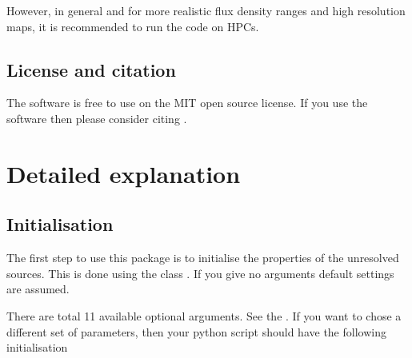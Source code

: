 \documentclass[letterpaper,10pt,english]{sphinxmanual}
\begin{document}
\sphinxAtStartPar
However, in general and for more realistic flux density ranges and high
resolution maps, it is recommended to run the code on HPCs.


\section{License and citation}
\label{\detokenize{basics:license-and-citation}}
\sphinxAtStartPar
The software is free to use on the MIT open source license. If you use the software then please consider citing .

\sphinxstepscope


\chapter{Detailed explanation}
\label{\detokenize{detexp:detailed-explanation}}\label{\detokenize{detexp::doc}}

\section{Initialisation}
\label{\detokenize{detexp:initialisation}}
\sphinxAtStartPar
The first step to use this package is to initialise the properties of the unresolved sources. This is done using the class
{\hyperref[\detokenize{api:furs.furs}]{}}. If you give no arguments default settings are assumed.

\sphinxAtStartPar
There are total 11 available optional arguments. See the {\hyperref[\detokenize{api:api}]{}}. If you want to chose a different set of parameters, then your python script should have the following initialisation

\begin{sphinxVerbatim}[commandchars=\\\{\}]
   
        
\end{sphinxVerbatim}
\end{document}
